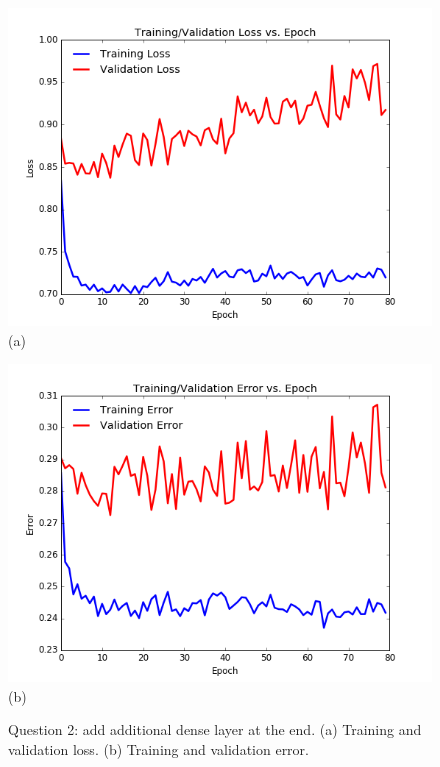 \documentclass[paper=a4, fontsize=11pt]{scrartcl}
\begin{document}
\begin{figure}
\centering
\centering
 \begin{minipage}{.5\columnwidth}
\centering
  	\includegraphics[width=1\linewidth]{question2_loss.png}
  	\footnotesize{(a)}
 \end{minipage}\hfill%
\centering
 \begin{minipage}{.5\columnwidth}
\centering
  	\includegraphics[width=1\columnwidth]{question2_error.png}
  	\footnotesize{(b)}
 \end{minipage}\hfill%
\caption{Question 2: add additional dense layer at the end. (a) Training and validation loss. (b) Training and validation error.}
\label{fig:question2}
\end{figure}
\end{document}
